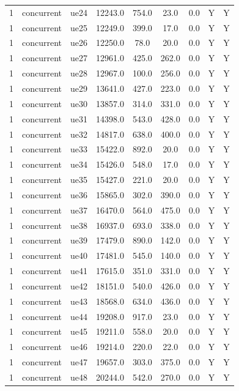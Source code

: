 \begin{table}[ht]
\begin{tabular}{|c|c|c|c|c|c|c|c|c|}
1 & concurrent & ue24 & 12243.0 & 754.0 & 23.0 & 0.0 & Y & Y \\
1 & concurrent & ue25 & 12249.0 & 399.0 & 17.0 & 0.0 & Y & Y \\
1 & concurrent & ue26 & 12250.0 & 78.0 & 20.0 & 0.0 & Y & Y \\
1 & concurrent & ue27 & 12961.0 & 425.0 & 262.0 & 0.0 & Y & Y \\
1 & concurrent & ue28 & 12967.0 & 100.0 & 256.0 & 0.0 & Y & Y \\
1 & concurrent & ue29 & 13641.0 & 427.0 & 223.0 & 0.0 & Y & Y \\
1 & concurrent & ue30 & 13857.0 & 314.0 & 331.0 & 0.0 & Y & Y \\
1 & concurrent & ue31 & 14398.0 & 543.0 & 428.0 & 0.0 & Y & Y \\
1 & concurrent & ue32 & 14817.0 & 638.0 & 400.0 & 0.0 & Y & Y \\
1 & concurrent & ue33 & 15422.0 & 892.0 & 20.0 & 0.0 & Y & Y \\
1 & concurrent & ue34 & 15426.0 & 548.0 & 17.0 & 0.0 & Y & Y \\
1 & concurrent & ue35 & 15427.0 & 221.0 & 20.0 & 0.0 & Y & Y \\
1 & concurrent & ue36 & 15865.0 & 302.0 & 390.0 & 0.0 & Y & Y \\
1 & concurrent & ue37 & 16470.0 & 564.0 & 475.0 & 0.0 & Y & Y \\
1 & concurrent & ue38 & 16937.0 & 693.0 & 338.0 & 0.0 & Y & Y \\
1 & concurrent & ue39 & 17479.0 & 890.0 & 142.0 & 0.0 & Y & Y \\
1 & concurrent & ue40 & 17481.0 & 545.0 & 140.0 & 0.0 & Y & Y \\
1 & concurrent & ue41 & 17615.0 & 351.0 & 331.0 & 0.0 & Y & Y \\
1 & concurrent & ue42 & 18151.0 & 540.0 & 426.0 & 0.0 & Y & Y \\
1 & concurrent & ue43 & 18568.0 & 634.0 & 436.0 & 0.0 & Y & Y \\
1 & concurrent & ue44 & 19208.0 & 917.0 & 23.0 & 0.0 & Y & Y \\
1 & concurrent & ue45 & 19211.0 & 558.0 & 20.0 & 0.0 & Y & Y \\
1 & concurrent & ue46 & 19214.0 & 220.0 & 22.0 & 0.0 & Y & Y \\
1 & concurrent & ue47 & 19657.0 & 303.0 & 375.0 & 0.0 & Y & Y \\
1 & concurrent & ue48 & 20244.0 & 542.0 & 270.0 & 0.0 & Y & Y \\

\end{tabular}
\end{table}

